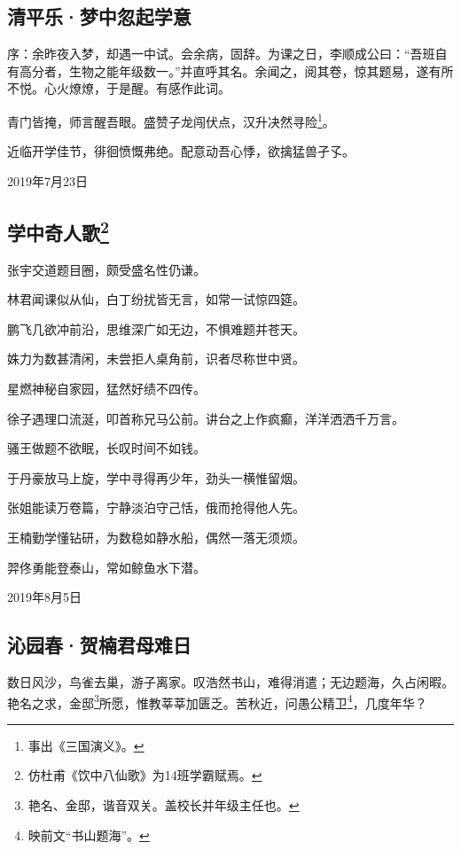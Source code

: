 \documentclass[a5paper]{ctexart}
\begin{document}
	
	\subsection{清平乐·梦中忽起学意}
	\begin{small}
		序：余昨夜入梦，却遇一中试。会余病，固辞。为课之日，李顺成公曰：“吾班自有高分者，生物之能年级数一。”并直呼其名。余闻之，阅其卷，惊其题易，遂有所不悦。心火燎燎，于是醒。有感作此词。
	\end{small}
	
	青门皆掩，师言醒吾眼。盛赞子龙闯伏点，汉升决然寻险\footnote{事出《三国演义》。}。
	
	近临开学佳节，徘徊愤慨弗绝。配意动吾心悸，欲擒猛兽孑孓。
	
	\hfill 2019年7月23日
	
	\subsection[学中奇人歌]{学中奇人歌\footnote{仿杜甫《饮中八仙歌》为14班学霸赋焉。}}
	张宇交道题目圈，颇受盛名性仍谦。
	
	林君闻课似从仙，白丁纷扰皆无言，如常一试惊四筵。
	
	鹏飞几欲冲前沿，思维深广如无边，不惧难题并苍天。
	
	姝力为数甚清闲，未尝拒人桌角前，识者尽称世中贤。
	
	星燃神秘自家园，猛然好绩不四传。
	
	徐子遇理口流涎，叩首称兄马公前。讲台之上作疯癫，洋洋洒洒千万言。
	
	骚王做题不欲眠，长叹时间不如钱。
	
	于丹豪放马上旋，学中寻得再少年，劲头一横惟留烟。
	
	张姐能读万卷篇，宁静淡泊守己恬，俄而抢得他人先。
	
	王楠勤学懂钻研，为数稳如静水船，偶然一落无须烦。
	
	羿佟勇能登泰山，常如鲸鱼水下潜。
	\begin{flushright}
		2019年8月5日
	\end{flushright}
	
	\subsection{沁园春·贺楠君母难日}
	数日风沙，鸟雀去巢，游子离家。叹浩然书山，难得消遣；无边题海，久占闲暇。艳名之求，金邸\footnote{艳名、金邸，谐音双关。盖校长并年级主任也。}所愿，惟教莘莘加匮乏。苦秋近，问愚公精卫\footnote{映前文“书山题海”。}，几度年华？
	
\end{document}
